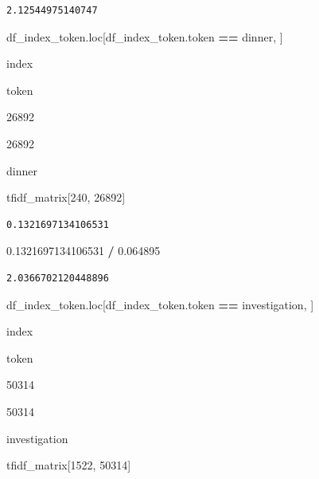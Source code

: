\documentclass[
  11pt,
  a4paper,
]{article}
\newenvironment{Shaded}{\begin{snugshade}}{\end{snugshade}}
\newcommand{\DecValTok}[1]{\textcolor[rgb]{0.00,0.00,0.81}{#1}}
\newcommand{\FloatTok}[1]{\textcolor[rgb]{0.00,0.00,0.81}{#1}}
\newcommand{\NormalTok}[1]{#1}
\newcommand{\OperatorTok}[1]{\textcolor[rgb]{0.81,0.36,0.00}{\textbf{#1}}}
\newcommand{\StringTok}[1]{\textcolor[rgb]{0.31,0.60,0.02}{#1}}
\begin{document}
\begin{verbatim}
2.12544975140747
\end{verbatim}

\begin{Shaded}
\begin{Highlighting}[]
\NormalTok{df\_index\_token.loc[df\_index\_token.token }\OperatorTok{==} \StringTok{\textquotesingle{}dinner\textquotesingle{}}\NormalTok{, ]}
\end{Highlighting}
\end{Shaded}

index

token

26892

26892

dinner

\begin{Shaded}
\begin{Highlighting}[]
\NormalTok{tfidf\_matrix[}\DecValTok{240}\NormalTok{, }\DecValTok{26892}\NormalTok{]}
\end{Highlighting}
\end{Shaded}

\begin{verbatim}
0.1321697134106531
\end{verbatim}

\begin{Shaded}
\begin{Highlighting}[]
\FloatTok{0.1321697134106531} \OperatorTok{/} \FloatTok{0.064895}
\end{Highlighting}
\end{Shaded}

\begin{verbatim}
2.0366702120448896
\end{verbatim}

\begin{Shaded}
\begin{Highlighting}[]
\NormalTok{df\_index\_token.loc[df\_index\_token.token }\OperatorTok{==} \StringTok{\textquotesingle{}investigation\textquotesingle{}}\NormalTok{, ]}
\end{Highlighting}
\end{Shaded}

index

token

50314

50314

investigation

\begin{Shaded}
\begin{Highlighting}[]
\NormalTok{tfidf\_matrix[}\DecValTok{1522}\NormalTok{, }\DecValTok{50314}\NormalTok{]}
\end{Highlighting}
\end{Shaded}
\end{document}
